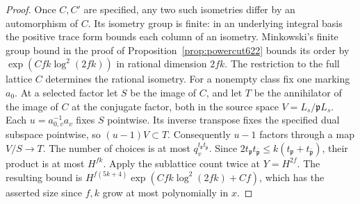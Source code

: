 \documentclass[a4paper,11pt]{article}
\theoremstyle{definition}
\theoremstyle{remark}
\numberwithin{equation}{section}
\begin{document}
\begin{proof}
Once \(C,C'\) are specified, any two such isometries differ by an
automorphism of \(C\). Its isometry group is finite: in an underlying
integral basis the positive trace form bounds each column of an
isometry. Minkowski's finite group bound in the proof of
Proposition~\ref{prop:powercut622} bounds its order by
\(\exp(Cfk\log^2(2fk))\) in rational dimension \(2fk\).
The restriction to the full lattice \(C\) determines the rational
isometry. For a nonempty class fix one marking \(a_0\). At a selected
factor let \(S\) be the image of \(C\), and let \(T\) be the
annihilator of the image of \(C\) at the conjugate factor, both
in the source space \(V=L_s/\mathfrak pL_s\). Each
\(u=a_{0,v}^{-1}a_v\) fixes \(S\) pointwise. Its inverse transpose
fixes the specified dual subspace pointwise, so \((u-1)V\subset T\).
Consequently \(u-1\) factors through a map \(V/S\to T\).
The number of choices is at most \(q_v^{t_{\mathfrak p}t_{\bar{\mathfrak p}}}\).
Since \(2t_{\mathfrak p}t_{\bar{\mathfrak p}}\le
k(t_{\mathfrak p}+t_{\bar{\mathfrak p}})\), their product is
at most \(H^{fk}\). Apply the sublattice count twice at \(Y=H^{2f}\).
The resulting bound is
\(H^{f(5k+4)}\exp(Cfk\log^2(2fk)+Cf)\), which has the asserted
size since \(f,k\) grow at most polynomially in \(x\).
\end{proof}
\end{document}
